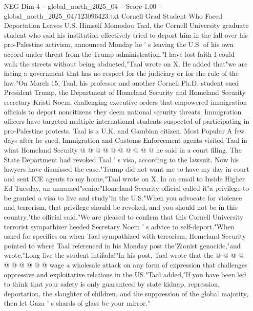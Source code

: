 \begin{textsample}{NEG Dim 4 – global\_north\_2025\_04 – Score 1.00 – global\_north\_2025\_04/123096423.txt}  \label{ex:f4_neg_247}
Cornell Grad Student Who Faced Deportation Leaves U.S.
Himself Momodou Taal, the Cornell University graduate student who said his institution effectively tried to deport him in the fall over his pro-Palestine activism, announced Monday he ' s leaving the U.S. of his own accord under threat from the Trump administration."I have lost faith I could walk the streets without being abducted,"Taal wrote on X.
He added that"we are facing a government that has no respect for the judiciary or for the rule of the law."On March 15, Taal, his professor and another Cornell Ph.D. student sued President Trump, the Department of Homeland Security and Homeland Security secretary Kristi Noem, challenging executive orders that empowered immigration officials to deport noncitizens they deem national security threats.
Immigration officers have targeted multiple international students suspected of participating in pro-Palestine protests.
Taal is a U.K. and Gambian citizen.
Most Popular A few days after he sued, Immigration and Customs Enforcement agents visited Taal in what Homeland Security @ @ @ @ @ @ @ @ @ @ he said in a court filing.
The State Department had revoked Taal ' s visa, according to the lawsuit.
Now his lawyers have dismissed the case."Trump did not want me to have my day in court and sent ICE agents to my home,"Taal wrote on X.
In an email to Inside Higher Ed Tuesday, an unnamed"senior"Homeland Security official called it"a privilege to be granted a visa to live and study"in the U.S."When you advocate for violence and terrorism, that privilege should be revoked, and you should not be in this country,"the official said."We are pleased to confirm that this Cornell University terrorist sympathizer heeded Secretary Noem ' s advice to self-deport."When asked for specifics on when Taal sympathized with terrorism, Homeland Security pointed to where Taal referenced in his Monday post the"Zionist genocide,"and wrote,"Long live the student intifada!"In his post, Taal wrote that the @ @ @ @ @ @ @ @ @ @ wage a wholesale attack on any form of expression that challenges oppressive and exploitative relations in the US."Taal added,"If you have been led to think that your safety is only guaranteed by state kidnap, repression, deportation, the slaughter of children, and the suppression of the global majority, then let Gaza ' s shards of glass be your mirror."

\end{textsample}
